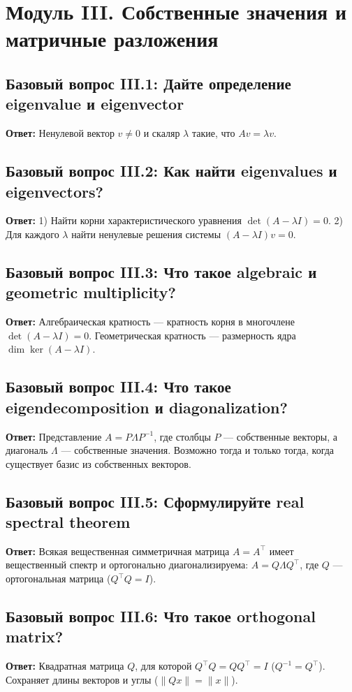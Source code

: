 \newpage

\section{Модуль III. Собственные значения и матричные разложения}

\subsection{Базовый вопрос III.1: Дайте определение eigenvalue и eigenvector}
\textbf{Ответ:} Ненулевой вектор $v \ne 0$ и скаляр $\lambda$ такие, что $Av = \lambda v$.

\subsection{Базовый вопрос III.2: Как найти eigenvalues и eigenvectors?}
\textbf{Ответ:} 1) Найти корни характеристического уравнения $\det(A - \lambda I) = 0$.
2) Для каждого $\lambda$ найти ненулевые решения системы $(A - \lambda I)v = 0$.

\subsection{Базовый вопрос III.3: Что такое algebraic и geometric multiplicity?}
\textbf{Ответ:} Алгебраическая кратность — кратность корня в многочлене $\det(A - \lambda I) = 0$.
Геометрическая кратность — размерность ядра $\dim \ker(A - \lambda I)$.

\subsection{Базовый вопрос III.4: Что такое eigendecomposition и diagonalization?}
\textbf{Ответ:} Представление $A=P \Lambda P^{-1}$, где столбцы $P$ — собственные векторы, а диагональ $\Lambda$ —
собственные значения.
Возможно тогда и только тогда, когда существует базис из собственных векторов.

\subsection{Базовый вопрос III.5: Сформулируйте real spectral theorem}
\textbf{Ответ:} Всякая вещественная симметричная матрица $A = A^\top$ имеет вещественный спектр и ортогонально
диагонализируема: $A = Q \Lambda Q^\top$, где $Q$ — ортогональная матрица ($Q^\top Q = I$).

\subsection{Базовый вопрос III.6: Что такое orthogonal matrix?}
\textbf{Ответ:} Квадратная матрица $Q$, для которой $Q^\top Q = Q Q^\top = I$ ($Q^{-1} = Q^\top$).
Сохраняет длины векторов и углы ($\|Qx\| = \|x\|$).

